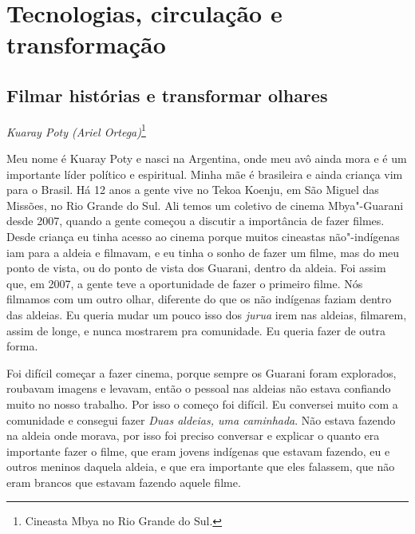 \makeatletter\@openrightfalse
\movetooddpage
\part{Tecnologias, circulação e transformação}


 


\chapter*{Filmar histórias e transformar olhares}


\@openrighttrue\makeatother
\begin{flushright}
\emph{Kuaray Poty (Ariel Ortega)}\footnote{Cineasta Mbya no Rio Grande do
Sul.}
\end{flushright}
\medskip

\noindent Meu nome é Kuaray Poty e nasci na Argentina, onde meu avô ainda mora e é
um importante líder político e espiritual. Minha mãe é brasileira e
ainda criança vim para o Brasil. Há 12 anos a gente vive no Tekoa
Koenju, em São Miguel das Missões, no Rio Grande do Sul. Ali temos um
coletivo de cinema Mbya"-Guarani desde 2007, quando a gente começou a
discutir a importância de fazer filmes. Desde criança eu tinha acesso
ao cinema porque muitos cineastas não"-indígenas iam para a aldeia e
filmavam, e eu tinha o sonho de fazer um filme, mas do meu ponto de
vista, ou do ponto de vista dos Guarani, dentro da aldeia. Foi assim
que, em 2007, a gente teve a oportunidade de fazer o primeiro filme.
Nós filmamos com um outro olhar, diferente do que os não indígenas
faziam dentro das aldeias. Eu queria mudar um pouco isso dos \emph{jurua} irem
nas aldeias, filmarem, assim de longe, e nunca mostrarem pra
comunidade. Eu queria fazer de outra forma. 

Foi difícil começar a fazer cinema, porque sempre os Guarani foram
explorados, roubavam imagens e levavam, então o pessoal nas aldeias não
estava confiando muito no nosso trabalho. Por isso o começo foi
difícil. Eu conversei muito com a comunidade e consegui fazer \emph{Duas
aldeias, uma caminhada}. Não estava fazendo na aldeia onde morava, por
isso foi preciso conversar e explicar o quanto era importante fazer o
filme, que eram jovens indígenas que estavam fazendo, eu e outros
meninos daquela aldeia, e que era importante que eles falassem, que não
eram brancos que estavam fazendo aquele filme. 

